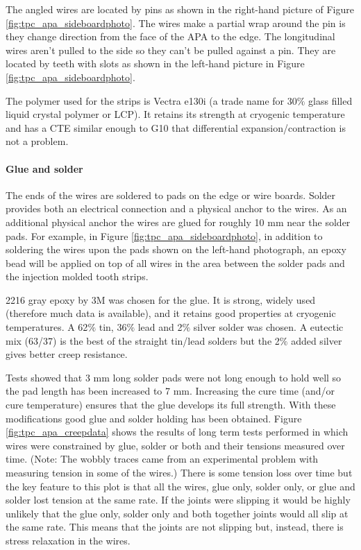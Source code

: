 The angled wires are located by pins as shown in the right-hand picture of Figure \ref{fig:tpc_apa_sideboardphoto}.  The wires make a partial wrap around the pin is they change direction from the face of the APA to the edge.  The longitudinal wires aren't pulled to the side so they can't be pulled against a pin.  They are located by teeth with slots as shown in the left-hand picture in Figure \ref{fig:tpc_apa_sideboardphoto}. 
	
The polymer used for the strips is Vectra e130i (a trade name for 30$\%$ glass filled liquid crystal polymer or LCP). It retains its strength at cryogenic temperature and has a CTE similar enough to G10 that differential expansion/contraction is not a problem.

\paragraph{Glue and solder}
The ends of the wires are soldered to pads on the edge or wire boards.  Solder provides both an electrical connection and a physical anchor to the wires.  As an additional physical anchor the wires are glued for roughly 10 mm near the solder pads.  For example, in Figure \ref{fig:tpc_apa_sideboardphoto}, in addition to soldering the wires upon the pads shown on the left-hand photograph, an epoxy bead will be applied on top of all wires in the area between the solder pads and the injection molded tooth strips.

2216 gray epoxy by 3M was chosen for the glue.  It is strong, widely used (therefore much data is available), and it retains good properties at cryogenic temperatures.  A 62$\%$ tin, 36$\%$ lead and 2$\%$ silver solder was chosen.  A eutectic mix (63/37) is the best of the straight tin/lead solders but the 2$\%$ added silver gives better creep resistance.

Tests showed that 3 mm long solder pads were not long enough to hold well so the pad length has been increased to 7 mm.  Increasing the cure time (and/or cure temperature) ensures that the glue develops its full strength.  With these modifications good glue and solder holding has been obtained.  Figure \ref{fig:tpc_apa_creepdata} shows the results of long term tests performed in which wires were constrained by glue, solder or both and their tensions measured over time. (Note: The wobbly traces came from an experimental problem with measuring tension in some of the wires.)  There is some tension loss over time but the key feature to this plot is that all the wires, glue only, solder only, or glue and solder lost tension at the same rate.  If the joints were slipping it would be highly unlikely that the glue only, solder only and both together joints would all slip at the same rate.  This means that the joints are not slipping but, instead, there is stress relaxation in the wires.

